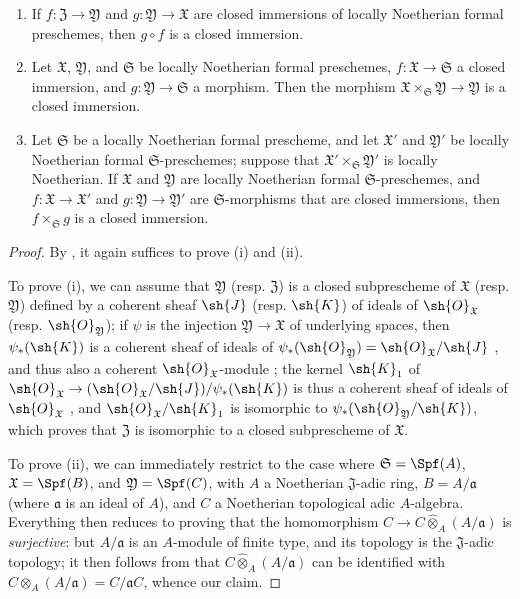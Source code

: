 \begin{proposition}[10.14.5]
\label{I.10.14.5}
\medskip\noindent
\begin{enumerate}
  \item[\rm{(i)}] If $f:\mathfrak{Z}\to\mathfrak{Y}$ and $g:\mathfrak{Y}\to\mathfrak{X}$ are closed immersions of locally Noetherian formal preschemes, then $g\circ f$ is a closed immersion.
  \item[\rm{(ii)}] Let $\mathfrak{X}$, $\mathfrak{Y}$, and $\mathfrak{S}$ be locally Noetherian formal preschemes, $f:\mathfrak{X}\to\mathfrak{S}$ a closed immersion, and $g:\mathfrak{Y}\to\mathfrak{S}$ a morphism.
    Then the morphism $\mathfrak{X}\times_\mathfrak{S}\mathfrak{Y}\to\mathfrak{Y}$ is a closed immersion.
  \item[\rm{(iii)}] Let $\mathfrak{S}$ be a locally Noetherian formal prescheme, and let $\mathfrak{X}'$ and $\mathfrak{Y}'$ be locally Noetherian formal $\mathfrak{S}$-preschemes; suppose that $\mathfrak{X}'\times_\mathfrak{S}\mathfrak{Y}'$ is locally Noetherian.
    If $\mathfrak{X}$ and $\mathfrak{Y}$ are locally Noetherian formal $\mathfrak{S}$-preschemes, and $f:\mathfrak{X}\to\mathfrak{X}'$ and $g:\mathfrak{Y}\to\mathfrak{Y}'$ are $\mathfrak{S}$-morphisms that are closed immersions, then $f\times_\mathfrak{S}g$ is a closed immersion.
\end{enumerate}
\end{proposition}

\begin{proof}
By , it again suffices to prove (i) and (ii).

To prove (i), we can assume that $\mathfrak{Y}$ (resp. $\mathfrak{Z}$) is a closed subprescheme of $\mathfrak{X}$ (resp. $\mathfrak{Y}$) defined by a coherent sheaf $\sh{J}$ (resp. $\sh{K}$) of ideals of $\sh{O}_\mathfrak{X}$ (resp. $\sh{O}_\mathfrak{Y}$);
if $\psi$ is the injection $\mathfrak{Y}\to\mathfrak{X}$ of underlying spaces, then $\psi_*(\sh{K})$ is a coherent sheaf of ideals of $\psi_*(\sh{O}_\mathfrak{Y})=\sh{O}_\mathfrak{X}/\sh{J}$ , and thus also a coherent $\sh{O}_\mathfrak{X}$-module ;
the kernel $\sh{K}_1$ of $\sh{O}_\mathfrak{X}\to(\sh{O}_\mathfrak{X}/\sh{J})/\psi_*(\sh{K})$ is thus a coherent sheaf of ideals of $\sh{O}_\mathfrak{X}$ , and $\sh{O}_\mathfrak{X}/\sh{K}_1$ is isomorphic to $\psi_*(\sh{O}_\mathfrak{Y}/\sh{K})$, which proves that $\mathfrak{Z}$ is isomorphic to a closed subprescheme of $\mathfrak{X}$.

To prove (ii), we can immediately restrict to the case where $\mathfrak{S}=\Spf(A)$, $\mathfrak{X}=\Spf(B)$, and $\mathfrak{Y}=\Spf(C)$, with $A$ a Noetherian $\mathfrak{J}$-adic ring, $B=A/\mathfrak{a}$ (where $\mathfrak{a}$ is an ideal of $A$), and $C$ a Noetherian topological adic $A$-algebra.
Everything then reduces to proving that the homomorphism $C\to C\widehat{\otimes}_A(A/\mathfrak{a})$ is \emph{surjective}:
but $A/\mathfrak{a}$ is an $A$-module of finite type, and its topology is the $\mathfrak{J}$-adic topology;
it then follows from  that $C\widehat{\otimes}_A(A/\mathfrak{a})$ can be identified with $C\otimes_A(A/\mathfrak{a})=C/\mathfrak{a}C$, whence our claim.
\end{proof}

